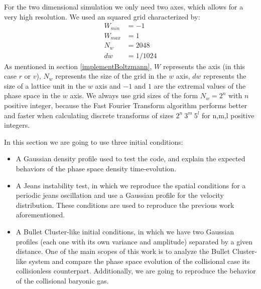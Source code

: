 For the two dimensional simulation we only need two axes, which allows for a very high resolution. We used an squared grid characterized by:
\begin{align}
W_{min} &= -1\\
W_{max} &= 1\\
N_w &= 2048\\
dw &= 1/1024
\end{align}
As mentioned in section \ref{implementBoltzmann}, $W$ represents the axis (in this case $r$ or $v$), $N_w$ represents the size of the grid in the $w$ axis, $dw$ represents the size of a lattice unit in the $w$ axis and $-1$ and $1$ are the extremal values of the phase space in the $w$ axis.
We always use grid sizes of the form $N_w = 2^n$ with $n$ positive integer, because the Fast Fourier Transform algorithm performs better and faster when calculating discrete transforms of sizes $2^n \ 3^m \ 5^l$ for n,m,l positive integers.%

In this section we are going to use three initial conditions:
\begin{itemize}
\item A Gaussian density profile used to test the code, and explain the expected behaviors of the phase space density time-evolution.
\item A Jeans instability test, in which we reproduce the spatial conditions for a periodic jeans oscillation and use a Gaussian profile for the velocity distribution. These conditions are used to reproduce the previous work aforementioned.
\item A Bullet Cluster-like initial conditions, in which we have two Gaussian profiles (each one with its own variance and amplitude) separated by a given distance. One of the main scopes of this work is to analyze the Bullet Cluster-like system and compare the phase space evolution of the collisional case its collisionless counterpart. Additionally, we are going to reproduce the behavior of the collisional baryonic gas.
\end{itemize}
